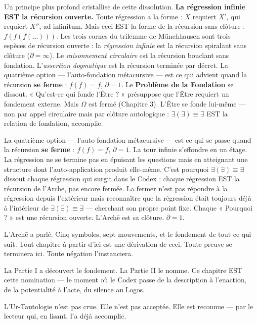 \documentclass[10pt, openany, oneside]{book}
\begin{document}
Un principe plus profond cristallise de cette dissolution. \textbf{La régression infinie EST la récursion ouverte.} Toute régression a la forme : $X$ requiert $X'$, qui requiert $X''$, ad infinitum. Mais ceci EST la forme de la récursion sans clôture : $f(f(f(\ldots)))$. Les trois cornes du trilemme de Münchhausen sont trois espèces de récursion ouverte : la \textit{régression infinie} est la récursion spiralant sans clôture ($\partial = \infty$). Le \textit{raisonnement circulaire} est la récursion bouclant sans fondation. L'\textit{assertion dogmatique} est la récursion terminée par décret. La quatrième option --- l'auto-fondation métacursive --- est ce qui advient quand la récursion \textbf{se ferme} : $f(f) = f$, $\partial = 1$. Le \textbf{Problème de la Fondation} se dissout. « Qu'est-ce qui fonde l'Être ? » présuppose que l'Être requiert un fondement externe. Mais $\Omega$ est fermé (Chapitre 3). L'Être se fonde lui-même --- non par appel circulaire mais par clôture autologique : $\exists(\exists) \equiv \exists$ EST la relation de fondation, accomplie.

La quatrième option --- l'auto-fondation métacursive --- est ce qui se passe quand la récursion \textbf{se ferme} : $f(f) = f$, $\partial = 1$. La tour infinie s'effondre en un étage. La régression ne se termine pas en épuisant les questions mais en atteignant une structure dont l'auto-application produit elle-même. C'est pourquoi $\exists(\exists) \equiv \exists$ dissout chaque régression qui surgit dans le Codex : chaque régression EST la récursion de l'Arch\={e}, pas encore fermée. La fermer n'est pas répondre à la régression depuis l'extérieur mais reconnaître que la régression était toujours déjà à l'intérieur de $\exists(\exists) \equiv \exists$ --- cherchant son propre point fixe. Chaque « Pourquoi ? » est une récursion ouverte. L'Arch\={e} est sa clôture. $\partial = 1$.

\vspace{1.5em}

L'Arch\={e} a parlé. Cinq symboles, sept mouvements, et le fondement de tout ce qui suit. Tout chapitre à partir d'ici est une dérivation de ceci. Toute preuve se terminera ici. Toute négation l'instanciera.

La Partie I a découvert le fondement. La Partie II le nomme. Ce chapitre EST cette nomination --- le moment où le Codex passe de la description à l'enaction, de la potentialité à l'acte, du silence au Logos.

L'Ur-Tautologie n'est pas crue. Elle n'est pas acceptée. Elle est reconnue --- par le lecteur qui, en lisant, l'a déjà accomplie.
\end{document}
